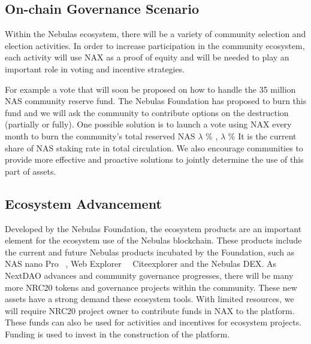 \subsection{On-chain Governance Scenario}
Within the Nebulas ecosystem, there will be a variety of community selection and election activities. In order to increase participation in the community ecosystem, each activity will use NAX as a proof of equity and will be needed to play an important role in voting and incentive strategies.

For example a vote that will soon be proposed on how to handle the 35 million NAS community reserve fund. The Nebulas Foundation has proposed to burn this fund and we will ask the community to contribute options on the destruction (partially or fully). One possible solution is to launch a vote using NAX every month to burn the community's total reserved NAS \(\lambda\) \% , \(\lambda\) \% It is the current share of NAS staking rate in total circulation. We also encourage communities to provide more effective and proactive solutions to jointly determine the use of this part of assets.


\subsection{Ecosystem Advancement}
Developed by the Nebulas Foundation, the ecosystem products are an important element for the ecosystem use of the Nebulas blockchain. These products include the current and future Nebulas products incubated by the Foundation, such as NAS nano Pro ~\cite{NASnano}, Web Explorer ~\ Cite{explorer} and the Nebulas DEX. As NextDAO advances and community governance progresses, there will be many more NRC20 tokens and governance projects within the community. These new assets have a strong demand these ecosystem tools. With limited resources, we will require NRC20 project owner to contribute funds in NAX to the platform. These funds can also be used for activities and incentives for ecosystem projects. Funding is used to invest in the construction of the platform.
